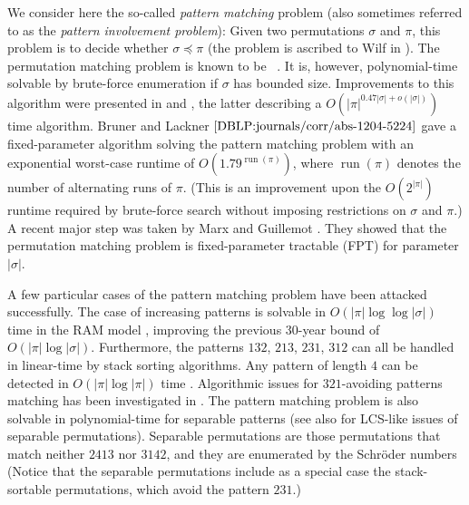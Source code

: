 \documentclass[a4paper]{llncs}
\DeclareMathOperator{\RUN}{run}
\newcounter{num}
\begin{document}
	We consider here the so-called \emph{pattern matching} problem
	(also sometimes referred to as the \emph{pattern involvement problem}):
	Given two permutations $\sigma$ and $\pi$, this problem is to decide whether
	$\sigma \preceq \pi$ (the problem is ascribed to Wilf in \cite{Bose:Buss:Lubiw:1998}).
	The permutation matching problem is known to be \NPhard~\cite{Bose:Buss:Lubiw:1998}.
	It is, however, polynomial-time solvable by brute-force enumeration
	if $\sigma$ has bounded size.
	Improvements to this algorithm were presented in
	\cite{Albert:Aldred:Atkinson:Holton:ISAAC:2001} and
	\cite{Ahal:Rabinovich:2008},
	the latter describing a $O(|\pi|^{0.47|\sigma|+o(|\sigma|)})$ time algorithm.
	Bruner and Lackner $\cite{DBLP:journals/corr/abs-1204-5224}$
	gave a fixed-parameter algorithm solving the pattern matching problem with
	an exponential worst-case runtime of $O(1.79^{\RUN(\pi)})$,
	where $\RUN(\pi)$ denotes the number of alternating runs of $\pi$.
	(This is an improvement upon the $O(2^{|\pi|})$ runtime required by
	brute-force search without imposing restrictions on $\sigma$ and $\pi$.)
	A recent major step was taken by Marx and Guillemot
	\cite{Guillemot:Marx:SODA:2014}.
	They showed that
	the permutation matching problem is fixed-parameter tractable (FPT) for
	parameter $|\sigma|$.

	A few particular cases of the pattern matching problem have been attacked successfully.
	The case of increasing patterns is solvable in
	$O(|\pi| \log \log |\sigma|)$ time in the RAM model \cite{Crochemore:Porat:2010},
	improving the previous 30-year bound of $O(|\pi| \log |\sigma|)$.
	Furthermore, the patterns $132$, $213$, $231$, $312$ can all be handled in linear-time
	by stack sorting algorithms.
	Any pattern of length $4$ can be detected in $O(|\pi| \log |\pi|)$ time
	\cite{Albert:Aldred:Atkinson:Holton:ISAAC:2001}.
	Algorithmic issues for $321$-avoiding patterns matching has been investigated in
	\cite{Guillemot:Vialette:ISAAC:2009}.
	The pattern matching problem is also solvable in
	polynomial-time for separable patterns \cite{Ibarra:1997,Bose:Buss:Lubiw:1998}
	(see also \cite{Bouvel:Rossin:Vialette:CPM:2007} for LCS-like issues
	of separable permutations).
	Separable permutations are those permutations that match neither
	$2413$ nor $3142$, and they are enumerated by the Schr{\"o}der numbers
	(Notice that the separable permutations include as a special case the
	stack-sortable permutations, which avoid the pattern $231$.)
\end{document}
